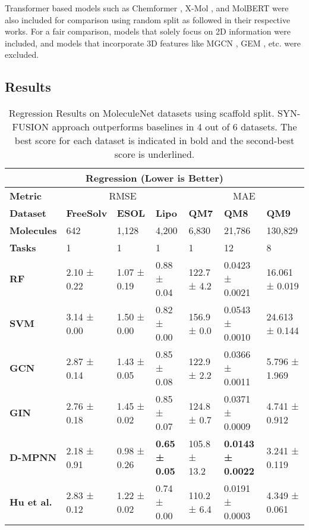 \documentclass[sigconf,nonacm]{acmart}
\begin{document}
Transformer based models
such as Chemformer \cite{Irwin_2022}, X-Mol \cite{XMOL-2022}, and MolBERT \cite{MolBERT2021} were also included for comparison using random split as followed in their respective works. For a fair comparison, models that solely focus on 2D information were included, and models that incorporate 3D features like MGCN \cite{Lu_Liu_Wang_Huang_Lin_He_2019}, GEM \cite{Fang2022}, etc. were excluded.


\subsection{Results}
\begin{table*}[!t]
    \caption{Regression Results on MoleculeNet datasets using scaffold split. SYN-FUSION approach outperforms baselines in 4 out of 6 datasets. The best score for each dataset is indicated in bold and the second-best score is underlined.}
    \centering
    \begin{tabular}[width=0.8\linewidth]{llll|lll}
        
        \hline
        \multicolumn{7}{c}{\textbf{Regression (Lower is Better)}} \\ \hline
        \textbf{Metric} & \multicolumn{3}{c}{RMSE} & \multicolumn{3}{c}{MAE} \\ \hline
        \textbf{Dataset} & \textbf{FreeSolv} & \textbf{ESOL} & \textbf{Lipo} & \textbf{QM7} & \textbf{QM8} & \textbf{QM9} \\ 
        \textbf{Molecules} & 642 & 1,128 & 4,200 & 6,830 & 21,786 & 130,829 \\ 
        \textbf{Tasks} & 1 & 1 & 1 & 1 & 12 & 8 \\  \hline

        \textbf{RF} & 2.10 ± 0.22 & 1.07 ± 0.19 & 0.88 ± 0.04 & 122.7 ± 4.2 & 0.0423 ± 0.0021 & 16.061 ± 0.019 \\

        \textbf{SVM} & 3.14 ± 0.00 & 1.50 ± 0.00 & 0.82 ± 0.00 & 156.9 ± 0.0 & 0.0543 ± 0.0010 & 24.613 ± 0.144 \\

        \textbf{GCN} \cite{DBLP:conf/iclr/KipfW17} & 2.87 ± 0.14 & 1.43 ± 0.05 & 0.85 ± 0.08 & 122.9 ± 2.2 & 0.0366 ± 0.0011 & 5.796 ± 1.969 \\
        \textbf{GIN} 
        \cite{DBLP:conf/iclr/XuHLJ19} & 2.76 ± 0.18 & 1.45 ± 0.02 & 0.85 ± 0.07 & 124.8 ± 0.7 & 0.0371 ± 0.0009 & 4.741 ± 0.912 \\ 
\textbf{D-MPNN} \cite{doi:10.1021/acs.jcim.9b00237} & 2.18 ± 0.91 & 0.98 ± 0.26 & \textbf{0.65 ± 0.05} & 105.8 ± 13.2 & \textbf{0.0143 ± 0.0022} & 3.241 ± 0.119 \\ 
        \textbf{Hu et al.} \cite{DBLP:conf/iclr/HuLGZLPL20} & 2.83 ± 0.12 & 1.22 ± 0.02 & 0.74 ± 0.00 & 110.2 ± 6.4 & 0.0191 ± 0.0003 & 4.349 ± 0.061 \\ 



\end{tabular}
\end{table*}
\end{document}
